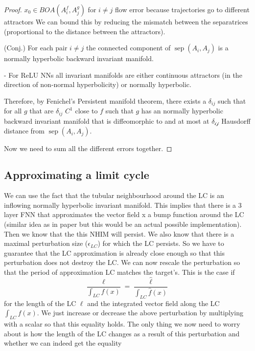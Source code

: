 \documentclass{article}
\theoremstyle{definition}
\theoremstyle{remark}
\newcommand{\sep}{\operatorname{sep}}
\begin{document}
\begin{proof}
$x_0\in BOA(A_i^f,A_j^g)$ for $i\neq j$
flow error because trajectories go to different attractors
We can bound this by reducing the mismatch between the separatrices (proportional to the distance between the attractors).

(Conj.) For each pair $i\neq j$ the connected component of $\sep(A_i,A_j)$ is a normally hyperbolic backward invariant manifold.

- For ReLU NNs all invariant manifolds are either continuous attractors (in the direction of non-normal hyperbolicity) or normally hyperbolic.

Therefore, by Fenichel's Persistent manifold theorem, there exists a $\delta_{ij}$ such that for all $g$ that are $\delta_{ij}$ $C^1$ close to $f$ such that $g$ has an  normally hyperbolic backward invariant manifold that is diffeomorphic to and at most at $\mathcal{\delta_{ij}}$ Hausdorff distance from $\sep(A_i,A_j)$.





Now we need to sum all the different errors together.
\end{proof}



\subsection{Approximating a limit cycle}


We can use the fact that the tubular neighbourhood around the LC is an inflowing normally hyperbolic invariant manifold.
This implies that there is a 3 layer FNN that approximates the vector field x a bump function around the LC (similar idea as in paper but this would be an actual possible implementation).
Then we know that the this NHIM will persist.
We also know that there is a maximal perturbation size ($\epsilon_{LC}$) for which the LC persists.
So we have to guarantee that the LC approximation is already close enough so that this perturbation does not destroy the LC.
We can now rescale the perturbation so that the period of approximation LC matches the target's. This is the case if 
\[\frac{\ell}{\int_{LC}f(x)} =  \frac{\hat \ell}{\int_{LC}\hat f(x)}\] for the length of the LC $\ell$ and the integrated vector field along the LC $\int_{LC}f(x)$.
We just increase or decrease  the above perturbation by multiplying with a scalar so that this equality holds.
The only thing we now need to worry about is how the length of the LC changes as a result of this perturbation and whether we can indeed get the equality 
\end{document}
